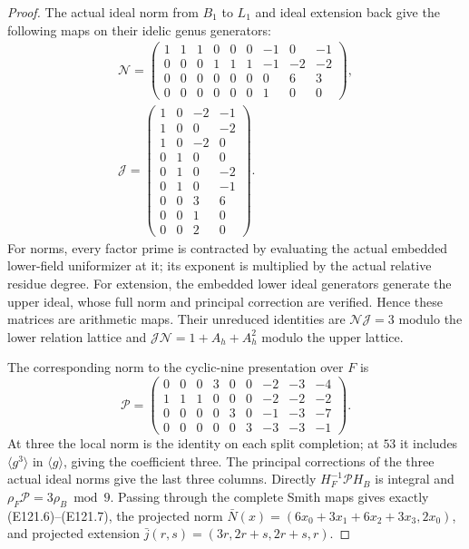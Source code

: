 \begin{proof}
The actual ideal norm from $B_1$ to $L_1$ and ideal extension
back give the following maps on their idelic genus generators:
\[
 \begin{gathered}
 \mathcal N=
 \begin{pmatrix}
 1&1&1&0&0&0&-1&0&-1\\
 0&0&0&1&1&1&-1&-2&-2\\
 0&0&0&0&0&0&0&6&3\\
 0&0&0&0&0&0&1&0&0
 \end{pmatrix},\\
 \mathcal J=
 \begin{pmatrix}
 1&0&-2&-1\\1&0&0&-2\\1&0&-2&0\\
 0&1&0&0\\0&1&0&-2\\0&1&0&-1\\
 0&0&3&6\\0&0&1&0\\0&0&2&0
 \end{pmatrix}.
 \end{gathered}
 \tag{E121.15}
\]
For norms, every factor prime is contracted by evaluating the
actual embedded lower-field uniformizer at it; its exponent
is multiplied by the actual relative residue degree. For
extension, the embedded lower ideal generators generate the
upper ideal, whose full norm and principal correction are
verified. Hence these matrices are arithmetic maps.
Their unreduced identities are
$\mathcal N\mathcal J=3$ modulo the lower relation lattice and
$\mathcal J\mathcal N=1+A_h+A_h^2$ modulo the upper lattice.

The corresponding norm to the cyclic-nine presentation over
$F$ is
\[
 \mathcal P=
 \begin{pmatrix}
 0&0&0&3&0&0&-2&-3&-4\\
 1&1&1&0&0&0&-2&-2&-2\\
 0&0&0&0&3&0&-1&-3&-7\\
 0&0&0&0&0&3&-3&-3&-1
 \end{pmatrix}.
 \tag{E121.16}
\]
At three the local norm is the identity on each split
completion; at $53$ it includes $\langle g^3\rangle$ in
$\langle g\rangle$, giving the coefficient three.
The principal corrections of the three actual ideal norms
give the last three columns. Directly
$H_F^{-1}\mathcal PH_B$ is integral and
$\rho_F\mathcal P=3\rho_B\bmod9$.
Passing through the complete Smith maps gives exactly
(E121.6)--(E121.7), the projected norm
$\bar N(x)=(6x_0+3x_1+6x_2+3x_3,2x_0)$, and projected extension
$\bar j(r,s)=(3r,2r+s,2r+s,r)$.


\end{proof}
